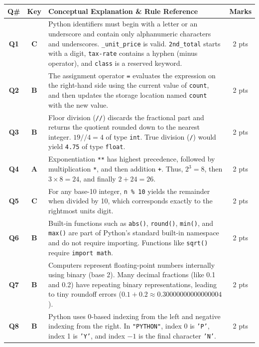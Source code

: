 \documentclass[11pt,a4paper]{article}
\begin{document}
\begin{center}
\renewcommand{\arraystretch}{1.35}
\begin{tabularx}{\textwidth}{|c|c|X|c|}
\hline
\textbf{Q\#} & \textbf{Key} & \textbf{Conceptual Explanation \& Rule Reference} & \textbf{Marks} \\
\hline
\textbf{Q1} & \textbf{C} & Python identifiers must begin with a letter or an underscore and contain only alphanumeric characters and underscores. \texttt{\_unit\_price} is valid. \texttt{2nd\_total} starts with a digit, \texttt{tax-rate} contains a hyphen (minus operator), and \texttt{class} is a reserved keyword. & 2 pts \\
\hline
\textbf{Q2} & \textbf{B} & The assignment operator \texttt{=} evaluates the expression on the right-hand side using the current value of \texttt{count}, and then updates the storage location named \texttt{count} with the new value. & 2 pts \\
\hline
\textbf{Q3} & \textbf{B} & Floor division (\texttt{//}) discards the fractional part and returns the quotient rounded down to the nearest integer. $19 // 4 = 4$ of type \texttt{int}. True division (\texttt{/}) would yield \texttt{4.75} of type \texttt{float}. & 2 pts \\
\hline
\textbf{Q4} & \textbf{A} & Exponentiation \texttt{**} has highest precedence, followed by multiplication \texttt{*}, and then addition \texttt{+}. Thus, $2^{3} = 8$, then $3 \times 8 = 24$, and finally $2 + 24 = 26$. & 2 pts \\
\hline
\textbf{Q5} & \textbf{C} & For any base-10 integer, \texttt{n \% 10} yields the remainder when divided by 10, which corresponds exactly to the rightmost units digit. & 2 pts \\
\hline
\textbf{Q6} & \textbf{B} & Built-in functions such as \texttt{abs()}, \texttt{round()}, \texttt{min()}, and \texttt{max()} are part of Python's standard built-in namespace and do not require importing. Functions like \texttt{sqrt()} require \texttt{import math}. & 2 pts \\
\hline
\textbf{Q7} & \textbf{B} & Computers represent floating-point numbers internally using binary (base 2). Many decimal fractions (like 0.1 and 0.2) have repeating binary representations, leading to tiny roundoff errors ($0.1 + 0.2 \approx 0.30000000000000004$). & 2 pts \\
\hline
\textbf{Q8} & \textbf{B} & Python uses 0-based indexing from the left and negative indexing from the right. In \texttt{"PYTHON"}, index 0 is \texttt{'P'}, index 1 is \texttt{'Y'}, and index $-1$ is the final character \texttt{'N'}. & 2 pts \\

\end{tabularx}
\end{center}
\end{document}
